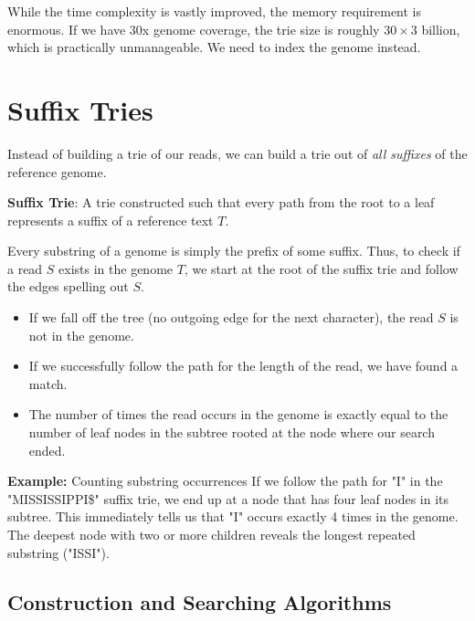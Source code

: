 While the time complexity is vastly improved, the memory requirement is enormous. If we have 30x genome coverage, the trie size is roughly $30 \times 3$ billion, which is practically unmanageable. We need to index the genome instead.

\section{Suffix Tries}

Instead of building a trie of our reads, we can build a trie out of \textit{all suffixes} of the reference genome.

\begin{important}
    \textbf{Suffix Trie}: A trie constructed such that every path from the root to a leaf represents a suffix of a reference text $T$.
\end{important}

Every substring of a genome is simply the prefix of some suffix. Thus, to check if a read $S$ exists in the genome $T$, we start at the root of the suffix trie and follow the edges spelling out $S$. 
\begin{itemize}
    \item If we fall off the tree (no outgoing edge for the next character), the read $S$ is not in the genome.
    \item If we successfully follow the path for the length of the read, we have found a match.
    \item The number of times the read occurs in the genome is exactly equal to the number of leaf nodes in the subtree rooted at the node where our search ended.
\end{itemize}


\textbf{Example:} Counting substring occurrences
If we follow the path for "I" in the "MISSISSIPPI\$" suffix trie, we end up at a node that has four leaf nodes in its subtree. This immediately tells us that "I" occurs exactly 4 times in the genome. The deepest node with two or more children reveals the longest repeated substring ("ISSI").

\subsection{Construction and Searching Algorithms}

